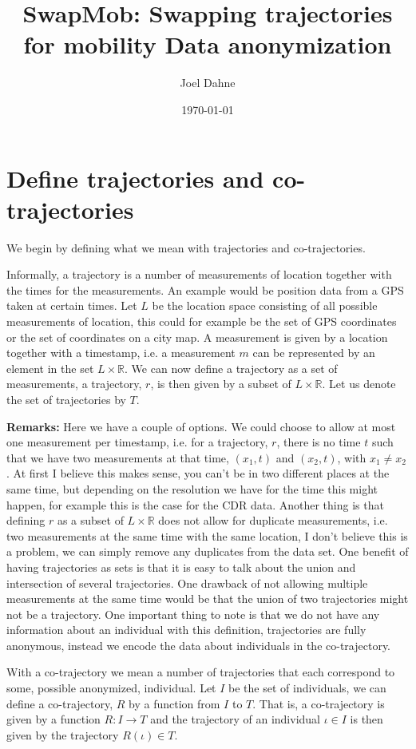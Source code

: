 \documentclass[11pt]{article}
\author{Joel Dahne}
\date{\today}
\title{SwapMob: Swapping trajectories for mobility Data anonymization}
\begin{document}
\maketitle
\tableofcontents


\section{Define trajectories and co-trajectories}
\label{sec:org7a8c28a}
We begin by defining what we mean with trajectories and
co-trajectories.

Informally, a trajectory is a number of measurements of location
together with the times for the measurements. An example would be
position data from a GPS taken at certain times. Let \(L\) be the
location space consisting of all possible measurements of location,
this could for example be the set of GPS coordinates or the set of
coordinates on a city map. A measurement is given by a location
together with a timestamp, i.e. a measurement \(m\) can be represented
by an element in the set \(L \times \mathbb{R}\). We can now define a
trajectory as a set of measurements, a trajectory, \(r\), is then
given by a subset of \(L \times \mathbb{R}\). Let us denote the set of
trajectories by \(T\).

\textbf{Remarks:} Here we have a couple of options. We could choose to allow
at most one measurement per timestamp, i.e. for a trajectory, \(r\),
there is no time \(t\) such that we have two measurements at that
time, \((x_1, t)\) and \((x_2, t)\), with \(x_1 \not= x_2\). At first
I believe this makes sense, you can't be in two different places at
the same time, but depending on the resolution we have for the time
this might happen, for example this is the case for the CDR data.
Another thing is that defining \(r\) as a subset of \(L \times
\mathbb{R}\) does not allow for duplicate measurements, i.e. two
measurements at the same time with the same location, I don't believe
this is a problem, we can simply remove any duplicates from the data
set. One benefit of having trajectories as sets is that it is easy to
talk about the union and intersection of several trajectories. One
drawback of not allowing multiple measurements at the same time would
be that the union of two trajectories might not be a trajectory. One
important thing to note is that we do not have any information about
an individual with this definition, trajectories are fully anonymous,
instead we encode the data about individuals in the co-trajectory.

With a co-trajectory we mean a number of trajectories that each
correspond to some, possible anonymized, individual. Let \(I\) be the
set of individuals, we can define a co-trajectory, \(R\) by a function
from \(I\) to \(T\). That is, a co-trajectory is given by a function
\(R: I \to T\) and the trajectory of an individual \(\iota \in I\) is
then given by the trajectory \(R(\iota) \in T\).
\end{document}
